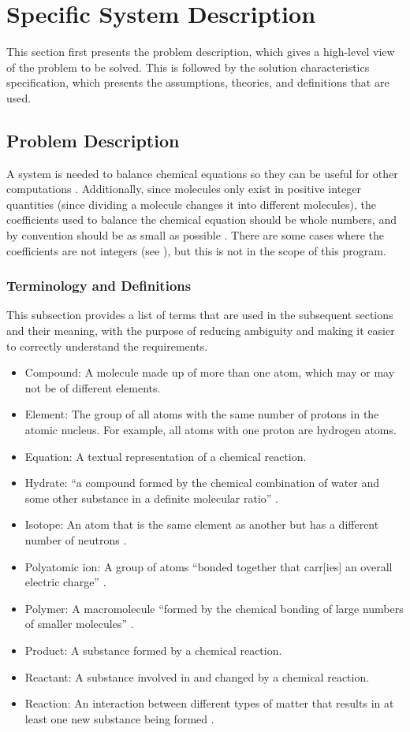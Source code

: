 \documentclass[12pt]{article}
\begin{document}
\section{Specific System Description}
\label{Sec:SpecSystDesc}
This section first presents the problem description, which gives a high-level view of the problem to be solved. This is followed by the solution characteristics specification, which presents the assumptions, theories, and definitions that are used.

\subsection{Problem Description}
\label{Sec:ProbDesc}
A system is needed to balance chemical equations so they can be useful for other computations \cite{lund2023}. Additionally, since molecules only exist in positive integer quantities (since dividing a molecule changes it into different molecules), the coefficients used to balance the chemical equation should be whole numbers, and by convention should be as small as possible \cite{lund2023}. There are some cases where the coefficients are not integers (see \cite{nonIntCoeffSource}), but this is not in the scope of this program.

\subsubsection{Terminology and Definitions}
\label{Sec:TermDefs}
This subsection provides a list of terms that are used in the subsequent sections and their meaning, with the purpose of reducing ambiguity and making it easier to correctly understand the requirements.

\begin{itemize}
\item{Compound: A molecule made up of more than one atom, which may or may not be of different elements.}
\item{Element: The group of all atoms with the same number of protons in the atomic nucleus. For example, all atoms with one proton are hydrogen atoms.}
\item{Equation: A textual representation of a chemical reaction.}
\item{Hydrate: ``a compound formed by the chemical combination of water and some other substance in a definite molecular ratio'' \cite{hydrateSource}.}
\item{Isotope: An atom that is the same element as another but has a different number of neutrons \cite{lund2023}.}
\item{Polyatomic ion: A group of atoms ``bonded together that carr[ies] an overall electric charge'' \cite{lund2023}.}
\item{Polymer: A macromolecule ``formed by the chemical bonding of large numbers of smaller molecules'' \cite{polymerSource}.}
\item{Product: A substance formed by a chemical reaction.}
\item{Reactant: A substance involved in and changed by a chemical reaction.}
\item{Reaction: An interaction between different types of matter that results in at least one new substance being formed \cite{lund2023}.}
\end{itemize}
\end{document}
